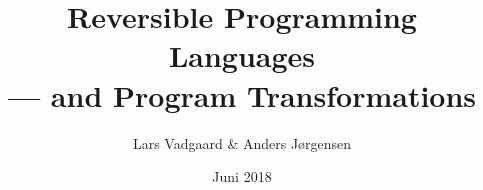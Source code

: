 \title{%
  Reversible Programming Languages\\
  --- and Program Transformations
}%
\author{Lars Vadgaard \& Anders Jørgensen}
\date{Juni 2018}%


\maketitle
\clearpage\maketitle
\thispagestyle{empty}
\newpage
\setcounter{page}{1}
